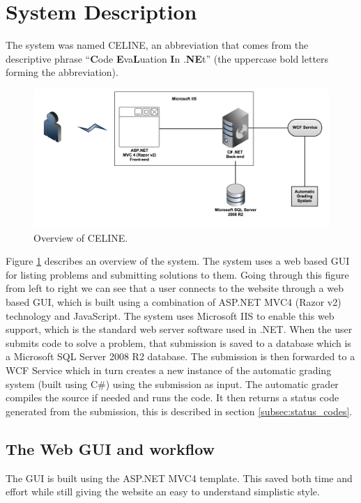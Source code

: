 \section{System Description}
The system was named CELINE, an abbreviation that comes from the descriptive phrase ``\textbf{C}ode \textbf{E}va\textbf{L}uation \textbf{I}n .\textbf{NE}t'' (the uppercase bold letters forming the abbreviation).

\begin{figure}[h]
	\centering
	\includegraphics[width=0.9\linewidth]{chapters/media/overview.png}
	\caption{Overview of CELINE.}
	\label{fig:SystemOverview}
\end{figure}

Figure \ref{fig:SystemOverview} describes an overview of the system. The system uses a web based GUI for listing problems and submitting solutions to them. Going through this figure from left to right we can see that a user connects to the website through a web based GUI, which is built using a combination of ASP.NET MVC4 (Razor v2) technology and JavaScript. The system uses Microsoft IIS to enable this web support, which is the standard web server software used in .NET. When the user submits code to solve a problem, that submission is saved to a database which is a Microsoft SQL Server 2008 R2 database. The submission is then forwarded to a WCF Service which in turn creates a new instance of the automatic grading system (built using C\#) using the submission as input. The automatic grader compiles the source if needed and runs the code. It then returns a status code generated from the submission, this is described in section \ref{subsec:status_codes}.


\subsection{The Web GUI and workflow}
The GUI is built using the ASP.NET MVC4 template. This saved both time and effort while still giving the website an easy to understand simplistic style.

